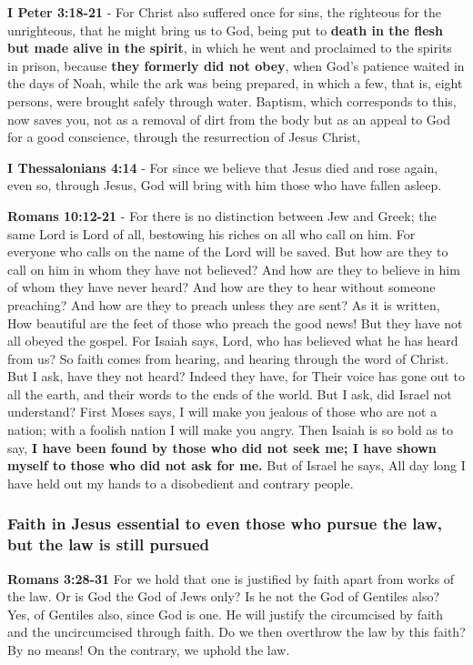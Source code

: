 \documentclass[11pt]{article}
\begin{document}
\textbf{I Peter 3:18-21} - For Christ also suffered once for sins, the righteous for the unrighteous, that he might bring us to God, being put to \textbf{death in the flesh but made alive in the spirit}, in which he went and proclaimed to the spirits in prison, because \textbf{they formerly did not obey}, when God's patience waited in the days of Noah, while the ark was being prepared, in which a few, that is, eight persons, were brought safely through water. Baptism, which corresponds to this, now saves you, not as a removal of dirt from the body but as an appeal to God for a good conscience, through the resurrection of Jesus Christ,

\textbf{I Thessalonians 4:14} - For since we believe that Jesus died and rose again, even so, through Jesus, God will bring with him those who have fallen asleep.

\textbf{Romans 10:12-21} - For there is no distinction between Jew and Greek; the same Lord is Lord of all, bestowing his riches on all who call on him.  For everyone who calls on the name of the Lord will be saved.  But how are they to call on him in whom they have not believed? And how are they to believe in him of whom they have never heard? And how are they to hear without someone preaching?  And how are they to preach unless they are sent? As it is written, How beautiful are the feet of those who preach the good news!  But they have not all obeyed the gospel. For Isaiah says, Lord, who has believed what he has heard from us?  So faith comes from hearing, and hearing through the word of Christ.  But I ask, have they not heard? Indeed they have, for Their voice has gone out to all the earth, and their words to the ends of the world.  But I ask, did Israel not understand? First Moses says, I will make you jealous of those who are not a nation; with a foolish nation I will make you angry.  Then Isaiah is so bold as to say, \textbf{I have been found by those who did not seek me; I have shown myself to those who did not ask for me.} But of Israel he says, All day long I have held out my hands to a disobedient and contrary people.

\subsubsection{Faith in Jesus essential to even those who pursue the law, but the law is still pursued}
\label{sec:org268bf40}
\textbf{Romans 3:28-31} For we hold that one is justified by faith apart from works of the law.  Or is God the God of Jews only? Is he not the God of Gentiles also? Yes, of Gentiles also, since God is one. He will justify the circumcised by faith and the uncircumcised through faith.  Do we then overthrow the law by this faith? By no means! On the contrary, we uphold the law.
\end{document}
